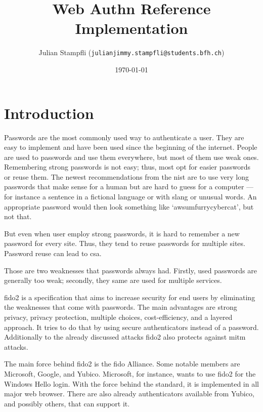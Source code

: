 \documentclass[a4paper, 11pt]{scrartcl}
\begin{document}
\title{Web Authn Reference Implementation}
\date{\today} 
\author{ Julian Stampfli (\texttt{julianjimmy.stampfli@students.bfh.ch}) }
\maketitle
\setcounter{tocdepth}{2}
\tableofcontents
\clearpage

\section{Introduction}

Passwords are the most commonly used way to authenticate a user. They are easy to implement and have been used since the beginning of the internet. People are used to passwords and use them everywhere, but most of them use weak ones. Remembering strong passwords is not easy; thus, most opt for easier passwords or reuse them. The newest recommendations from the \gls{nist} are to use very long passwords that make sense for a human but are hard to guess for a computer — for instance a sentence in a fictional language or with slang or unusual words. An appropriate password would then look something like `awsumfurrycybercat', but not that\cite{nist:pw:blog, nist:pw}.

But even when user employ strong passwords, it is hard to remember a new password for every site. Thus, they tend to reuse passwords for multiple sites. Password reuse can lead to \gls{csa}\cite{panda:pwreuse, xkcd:pwreuse}.

Those are two weaknesses that passwords always had. Firstly, used passwords are generally too weak; secondly, they same are used for multiple services. 

\gls{fido2} is a specification that aims to increase security for end users by eliminating the weaknesses that come with passwords. The main advantages are strong privacy, privacy protection, multiple choices, cost-efficiency, and a layered approach. It tries to do that by using secure authenticators instead of a password.  Additionally to the already discussed attacks \gls{fido2} also protects against \gls{mitm} attacks\cite{yubico:whatIsFido2}.

The main force behind \gls{fido2} is the \gls{fido} Alliance. Some notable members are Microsoft, Google, and Yubico. Microsoft, for instance, wants to use \gls{fido2} for the Windows Hello login\cite{yubico:ms}. With the force behind the standard, it is implemented in all major web browser\cite{fido:browser}. There are also already authenticators available from Yubico, and possibly others, that can support it\cite{yubico:yubikey5}.
\end{document}
